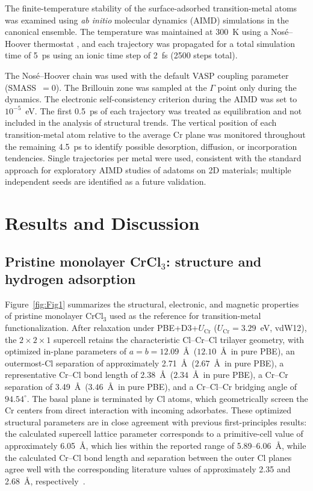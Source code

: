\documentclass[journal=jacsat,manuscript=article]{achemso}
\begin{document}
The finite-temperature stability of the surface-adsorbed transition-metal atoms was examined using \textit{ab initio} molecular dynamics (AIMD) simulations in the canonical ensemble. The temperature was maintained at 300~K using a Nosé--Hoover thermostat \cite{Nose1984,Hoover1985}, and each trajectory was propagated for a total simulation time of 5~ps using an ionic time step of 2~fs (2500 steps total). {\color{revcolor}%
  The Nosé--Hoover chain was used with the default VASP coupling parameter (SMASS~$=0$). The Brillouin zone was sampled at the $\Gamma$ point only during the dynamics. The electronic self-consistency criterion during the AIMD was set to $10^{-5}$~eV. The first 0.5~ps of each trajectory was treated as equilibration and not included in the analysis of structural trends. The vertical position of each transition-metal atom relative to the average Cr plane was monitored throughout the remaining 4.5~ps to identify possible desorption, diffusion, or incorporation tendencies. Single trajectories per metal were used, consistent with the standard approach for exploratory AIMD studies of adatoms on 2D materials; multiple independent seeds are identified as a future validation.
\par}

\section{Results and Discussion}

\subsection{Pristine monolayer CrCl$_3$: structure and hydrogen adsorption}

\noindent Figure~\ref{fig:Fig1} summarizes the structural, electronic, and magnetic properties of pristine monolayer CrCl$_3$ used as the reference for transition-metal functionalization. After relaxation under PBE+D3+$U_{\mathrm{Cr}}$ ($U_{\mathrm{Cr}} = 3.29$~eV, vdW12), the $2\times2 \times 1$ supercell retains the characteristic Cl--Cr--Cl trilayer geometry, with optimized in-plane parameters of $a=b=12.09$~\AA\ ($12.10$~\AA\ in pure PBE), an outermost-Cl separation of approximately 2.71~\AA\ ($2.67$~\AA\ in pure PBE), a representative Cr--Cl bond length of 2.38~\AA\ ($2.34$~\AA\ in pure PBE), a Cr--Cr separation of 3.49~\AA\ ($3.46$~\AA\ in pure PBE), and a Cr--Cl--Cr bridging angle of $94.54^\circ$. The basal plane is terminated by Cl atoms, which geometrically screen the Cr centers from direct interaction with incoming adsorbates. These optimized structural parameters are in close agreement with previous first-principles results: the calculated supercell lattice parameter corresponds to a primitive-cell value of approximately 6.05~\AA, which lies within the reported range of 5.89--6.06~\AA, while the calculated Cr--Cl bond length and separation between the outer Cl planes agree well with the corresponding literature values of approximately 2.35 and 2.68~\AA, respectively~\cite{Webster2018,Gao2018,Mastrippolito2022,Zala2024}.
\end{document}
